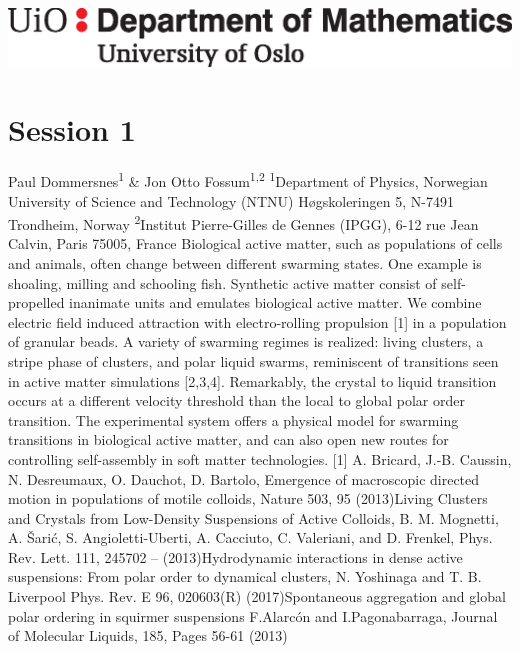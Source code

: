 \documentclass{article}
\begin{document}
\clearpage



\includegraphics[scale=0.3]{img/mat-mn-navn-eng.eps}


\section*{Session 1}
{Paul Dommersnes\textsuperscript{1} \& Jon Otto Fossum\textsuperscript{1,2}}
{\textsuperscript{1}Department of Physics, Norwegian University of Science and Technology (NTNU) Høgskoleringen 5, N-7491 Trondheim, Norway \newline
    \textsuperscript{2}Institut Pierre-Gilles de Gennes (IPGG), 6-12 rue Jean Calvin, Paris 75005, France}
{Biological active matter, such as populations of cells and animals, often change between
different swarming states. One example is shoaling, milling and schooling fish. Synthetic
active matter consist of self-propelled inanimate units and emulates biological active matter.
We combine electric field induced attraction with electro-rolling propulsion [1] in a
population of granular beads. A variety of swarming regimes is realized: living clusters, a stripe
phase of clusters, and polar liquid swarms, reminiscent of transitions seen in active matter
simulations [2,3,4]. Remarkably, the crystal to liquid transition occurs at a different velocity
threshold than the local to global polar order transition. The experimental system offers a
physical model for swarming transitions in biological active matter, and can also open new
routes for controlling self-assembly in soft matter technologies.\newline\newline
\small{
[1] A. Bricard, J.-B. Caussin, N. Desreumaux, O. Dauchot, D. Bartolo, Emergence of macroscopic
directed motion in populations of motile colloids, Nature 503, 95 (2013)\newline
[2] Living Clusters and Crystals from Low-Density Suspensions of Active Colloids, B. M. Mognetti, A.
Šarić, S. Angioletti-Uberti, A. Cacciuto, C. Valeriani, and D. Frenkel, Phys. Rev. Lett. 111, 245702 – (2013)\newline
[3] Hydrodynamic interactions in dense active suspensions: From polar order to dynamical clusters,
N. Yoshinaga and T. B. Liverpool Phys. Rev. E 96, 020603(R) (2017)\newline
[4] Spontaneous aggregation and global polar ordering in squirmer suspensions
F.Alarcón and I.Pagonabarraga, Journal of Molecular Liquids, 185, Pages 56-61 (2013)}}
\end{document}
